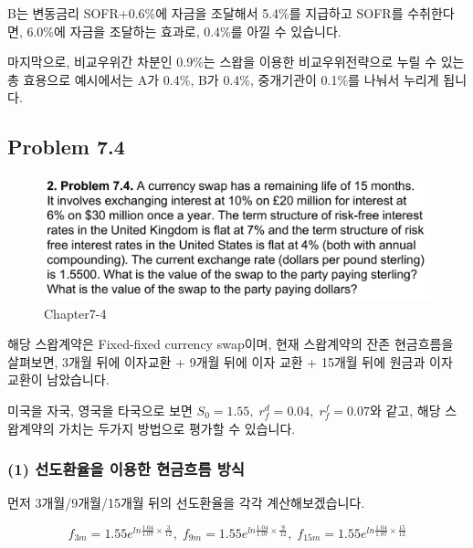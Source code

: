 \documentclass[
  letterpaper,
  DIV=11,
  numbers=noendperiod]{scrreprt}
\begin{document}
B는 변동금리 SOFR+0.6\%에 자금을 조달해서 5.4\%를 지급하고 SOFR를
수취한다면, 6.0\%에 자금을 조달하는 효과로, 0.4\%를 아낄 수 있습니다.

마지막으로, 비교우위간 차분인 0.9\%는 스왑을 이용한 비교우위전략으로
누릴 수 있는 총 효용으로 예시에서는 A가 0.4\%, B가 0.4\%, 중개기관이
0.1\%를 나눠서 누리게 됩니다.

\subsection*{\texorpdfstring{\textbf{Problem
7.4}}{Problem 7.4}}\label{problem-7.4}

\begin{figure}[H]

{\centering \includegraphics{images/선물옵션_7-4.png}

}

\caption{Chapter7-4}

\end{figure}%

해당 스왑계약은 Fixed-fixed currency swap이며, 현재 스왑계약의 잔존
현금흐름을 살펴보면, 3개월 뒤에 이자교환 + 9개월 뒤에 이자 교환 + 15개월
뒤에 원금과 이자 교환이 남았습니다.

미국을 자국, 영국을 타국으로 보면
\(S_0=1.55,\;r_f^d=0.04,\;r_f^f=0.07\)와 같고, 해당 스왑계약의 가치는
두가지 방법으로 평가할 수 있습니다.

\subsubsection*{(1) 선도환율을 이용한 현금흐름
방식}\label{uxc120uxb3c4uxd658uxc728uxc744-uxc774uxc6a9uxd55c-uxd604uxae08uxd750uxb984-uxbc29uxc2dd}

먼저 3개월/9개월/15개월 뒤의 선도환율을 각각 계산해보겠습니다.

\[f_{3m}=1.55e^{ln\frac{1.04}{1.07}\times\frac{3}{12}},\;f_{9m}=1.55e^{ln\frac{1.04}{1.07}\times\frac{9}{12}},\;f_{15m}=1.55e^{ln\frac{1.04}{1.07}\times\frac{15}{12}}\]
\end{document}
